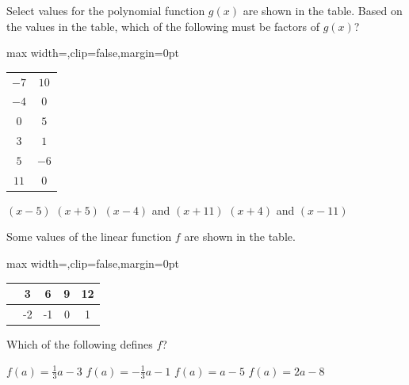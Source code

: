 \newpage




\question[1]
Select values for the polynomial function $g(x)$ are shown in the table. Based on the values in the table, which of the following must be factors of $g(x)$?
\begin{center}
  \renewcommand{\arraystretch}{1.3}
  \setlength{\tabcolsep}{0.5em}
  \label{tab:sat-drill-10-g-sample}%
  \vspace{0.35em}
  \begin{adjustbox}{max width=\linewidth,clip=false,margin=0pt}
  \begin{tabular}{|c|c|}
    \hline
    \cellcolor[HTML]{E0E0E0}{$x$} & \cellcolor[HTML]{E0E0E0}{$g(x)$} \\
    \hline
    $-7$ & $10$ \\
    \hline
    $-4$ & $0$ \\
    \hline
    $0$ & $5$ \\
    \hline
    $3$ & $1$ \\
    \hline
    $5$ & $-6$ \\
    \hline
    $11$ & $0$ \\
    \hline
  \end{tabular}
  \end{adjustbox}
\end{center}
\begin{choices}
  \choice $(x-5)$
  \choice $(x+5)$
  \choice $(x-4)$ and $(x+11)$
  \CorrectChoice $(x+4)$ and $(x-11)$
\end{choices}

\question[1]
Some values of the linear function $f$ are shown in the table.
\begin{center}
  \renewcommand{\arraystretch}{1.3}
  \setlength{\tabcolsep}{0.5em}
  \label{tab:sat-drill-10-f-linear}%
  \vspace{0.35em}
  \begin{adjustbox}{max width=\linewidth,clip=false,margin=0pt}
  \begin{tabular}{|c|c|c|c|c|}
    \hline
    \cellcolor[HTML]{E0E0E0}{$a$} & 3 & 6 & 9 & 12 \\
    \hline
    \cellcolor[HTML]{E0E0E0}{$f(a)$} & -2 & -1 & 0 & 1 \\
    \hline
  \end{tabular}
  \end{adjustbox}
\end{center}
Which of the following defines $f$?
\begin{choices}
  \CorrectChoice $f(a)=\frac{1}{3}a-3$
  \choice $f(a)=-\frac{1}{3}a-1$
  \choice $f(a)=a-5$
  \choice $f(a)=2a-8$
\end{choices}






